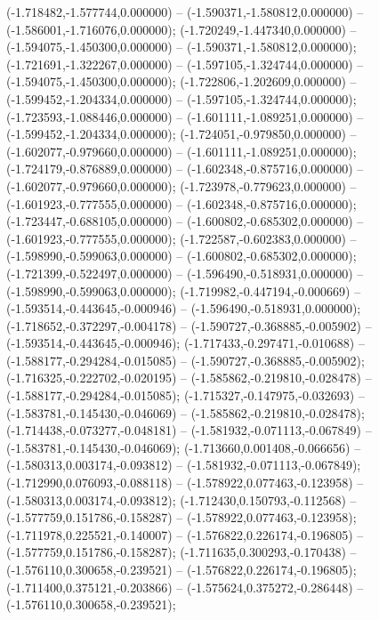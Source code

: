  (-1.718482,-1.577744,0.000000) -- (-1.590371,-1.580812,0.000000) -- (-1.586001,-1.716076,0.000000);
 (-1.720249,-1.447340,0.000000) -- (-1.594075,-1.450300,0.000000) -- (-1.590371,-1.580812,0.000000);
 (-1.721691,-1.322267,0.000000) -- (-1.597105,-1.324744,0.000000) -- (-1.594075,-1.450300,0.000000);
 (-1.722806,-1.202609,0.000000) -- (-1.599452,-1.204334,0.000000) -- (-1.597105,-1.324744,0.000000);
 (-1.723593,-1.088446,0.000000) -- (-1.601111,-1.089251,0.000000) -- (-1.599452,-1.204334,0.000000);
 (-1.724051,-0.979850,0.000000) -- (-1.602077,-0.979660,0.000000) -- (-1.601111,-1.089251,0.000000);
 (-1.724179,-0.876889,0.000000) -- (-1.602348,-0.875716,0.000000) -- (-1.602077,-0.979660,0.000000);
 (-1.723978,-0.779623,0.000000) -- (-1.601923,-0.777555,0.000000) -- (-1.602348,-0.875716,0.000000);
 (-1.723447,-0.688105,0.000000) -- (-1.600802,-0.685302,0.000000) -- (-1.601923,-0.777555,0.000000);
 (-1.722587,-0.602383,0.000000) -- (-1.598990,-0.599063,0.000000) -- (-1.600802,-0.685302,0.000000);
 (-1.721399,-0.522497,0.000000) -- (-1.596490,-0.518931,0.000000) -- (-1.598990,-0.599063,0.000000);
 (-1.719982,-0.447194,-0.000669) -- (-1.593514,-0.443645,-0.000946) -- (-1.596490,-0.518931,0.000000);
 (-1.718652,-0.372297,-0.004178) -- (-1.590727,-0.368885,-0.005902) -- (-1.593514,-0.443645,-0.000946);
 (-1.717433,-0.297471,-0.010688) -- (-1.588177,-0.294284,-0.015085) -- (-1.590727,-0.368885,-0.005902);
 (-1.716325,-0.222702,-0.020195) -- (-1.585862,-0.219810,-0.028478) -- (-1.588177,-0.294284,-0.015085);
 (-1.715327,-0.147975,-0.032693) -- (-1.583781,-0.145430,-0.046069) -- (-1.585862,-0.219810,-0.028478);
 (-1.714438,-0.073277,-0.048181) -- (-1.581932,-0.071113,-0.067849) -- (-1.583781,-0.145430,-0.046069);
 (-1.713660,0.001408,-0.066656) -- (-1.580313,0.003174,-0.093812) -- (-1.581932,-0.071113,-0.067849);
 (-1.712990,0.076093,-0.088118) -- (-1.578922,0.077463,-0.123958) -- (-1.580313,0.003174,-0.093812);
 (-1.712430,0.150793,-0.112568) -- (-1.577759,0.151786,-0.158287) -- (-1.578922,0.077463,-0.123958);
 (-1.711978,0.225521,-0.140007) -- (-1.576822,0.226174,-0.196805) -- (-1.577759,0.151786,-0.158287);
 (-1.711635,0.300293,-0.170438) -- (-1.576110,0.300658,-0.239521) -- (-1.576822,0.226174,-0.196805);
 (-1.711400,0.375121,-0.203866) -- (-1.575624,0.375272,-0.286448) -- (-1.576110,0.300658,-0.239521);
